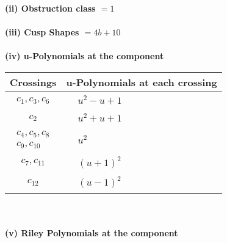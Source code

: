 \documentclass[1p]{elsarticle_modified}
\theoremstyle{definition}
\begin{document}
\flushleft \textbf{(ii) Obstruction class $= 1$}\\~\\
\flushleft \textbf{(iii) Cusp Shapes $= 4 b+10$}\\~\\
\newpage\renewcommand{\arraystretch}{1}
\flushleft \textbf{(iv) u-Polynomials at the component}\newline \\
\begin{tabular}{m{50pt}|m{274pt}}
Crossings & \hspace{64pt}u-Polynomials at each crossing \\
\hline $$\begin{aligned}c_{1},c_{3},c_{6}\end{aligned}$$&$\begin{aligned}
&u^2- u+1
\end{aligned}$\\
\hline $$\begin{aligned}c_{2}\end{aligned}$$&$\begin{aligned}
&u^2+u+1
\end{aligned}$\\
\hline $$\begin{aligned}c_{4},c_{5},c_{8}\\c_{9},c_{10}\end{aligned}$$&$\begin{aligned}
&u^2
\end{aligned}$\\
\hline $$\begin{aligned}c_{7},c_{11}\end{aligned}$$&$\begin{aligned}
&(u+1)^2
\end{aligned}$\\
\hline $$\begin{aligned}c_{12}\end{aligned}$$&$\begin{aligned}
&(u-1)^2
\end{aligned}$\\
\hline
\end{tabular}\\~\\
\newpage\renewcommand{\arraystretch}{1}
\flushleft \textbf{(v) Riley Polynomials at the component}\newline \\
\end{document}
